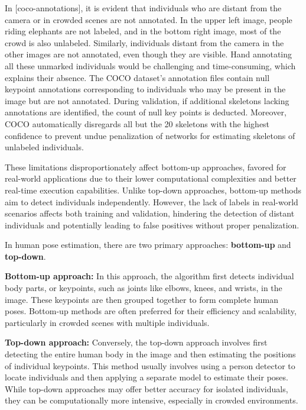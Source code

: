 
In [coco-annotations], it is evident that individuals who are distant from the camera or in crowded scenes are not annotated. In the upper left image, people riding elephants are not labeled, and in the bottom right image, most of the crowd is also unlabeled. Similarly, individuals distant from the camera in the other images are not annotated, even though they are visible. Hand annotating all these unmarked individuals would be challenging and time-consuming, which explains their absence. The COCO dataset's annotation files contain null keypoint annotations corresponding to individuals who may be present in the image but are not annotated. During validation, if additional skeletons lacking annotations are identified, the count of null key points is deducted. Moreover, COCO automatically disregards all but the 20 skeletons with the highest confidence to prevent undue penalization of networks for estimating skeletons of unlabeled individuals.

These limitations disproportionately affect bottom-up approaches, favored for real-world applications due to their lower computational complexities and better real-time execution capabilities. Unlike top-down approaches, bottom-up methods aim to detect individuals independently. However, the lack of labels in real-world scenarios affects both training and validation, hindering the detection of distant individuals and potentially leading to false positives without proper penalization.

In human pose estimation, there are two primary approaches: {\bf bottom-up} and {\bf top-down}.

\startitemize[n]
    \item {\bf Bottom-up approach:} In this approach, the algorithm first detects individual body parts, or keypoints, such as joints like elbows, knees, and wrists, in the image. These keypoints are then grouped together to form complete human poses. Bottom-up methods are often preferred for their efficiency and scalability, particularly in crowded scenes with multiple individuals.
    \item {\bf Top-down approach:} Conversely, the top-down approach involves first detecting the entire human body in the image and then estimating the positions of individual keypoints. This method usually involves using a person detector to locate individuals and then applying a separate model to estimate their poses. While top-down approaches may offer better accuracy for isolated individuals, they can be computationally more intensive, especially in crowded environments.
\stopitemize

